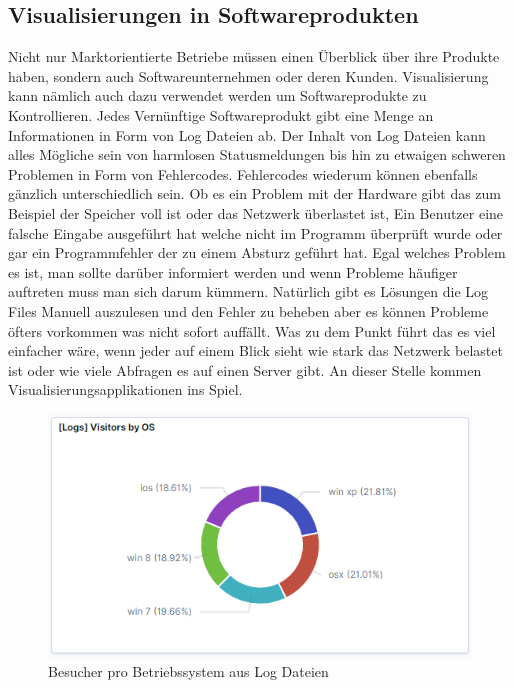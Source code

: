 \subsection{Visualisierungen in Softwareprodukten}
Nicht nur Marktorientierte Betriebe müssen einen Überblick über ihre Produkte haben, sondern auch Softwareunternehmen oder deren Kunden. Visualisierung kann nämlich auch dazu verwendet werden um Softwareprodukte zu Kontrollieren. Jedes Vernünftige Softwareprodukt gibt eine Menge an Informationen in Form von Log Dateien ab. Der Inhalt von Log Dateien kann alles Mögliche sein von harmlosen Statusmeldungen bis hin zu etwaigen schweren Problemen in Form von Fehlercodes. Fehlercodes wiederum können ebenfalls gänzlich unterschiedlich sein. Ob es ein Problem mit der Hardware gibt das zum Beispiel der Speicher voll ist oder das Netzwerk überlastet ist, Ein Benutzer eine falsche Eingabe ausgeführt hat welche nicht im Programm überprüft wurde oder gar ein Programmfehler der zu einem Absturz geführt hat. Egal welches Problem es ist, man sollte darüber informiert werden und wenn Probleme häufiger auftreten muss man sich darum kümmern. Natürlich gibt es Lösungen die Log Files Manuell auszulesen und den Fehler zu beheben aber es können Probleme öfters vorkommen was nicht sofort auffällt. Was zu dem Punkt führt das es viel einfacher wäre, wenn jeder auf einem Blick sieht wie stark das Netzwerk belastet ist oder wie viele Abfragen es auf einen Server gibt. An dieser Stelle kommen Visualisierungsapplikationen ins Spiel.
\begin{figure}[H]
    \centering
    \includegraphics[scale=1.3]{images/sampleLogs1.PNG}
    \caption{Besucher pro Betriebssystem aus Log Dateien}
\end{figure}
